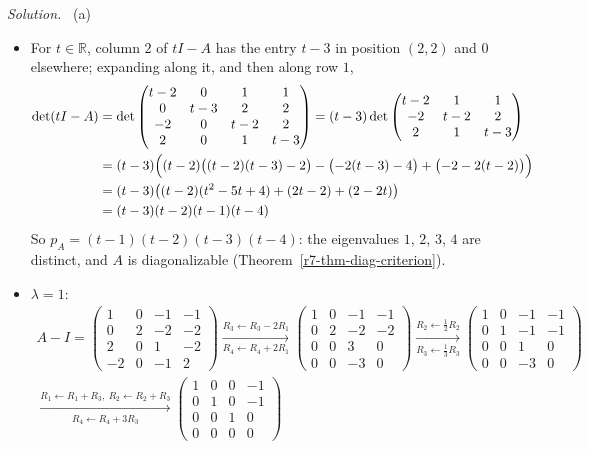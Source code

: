 \documentclass[12pt]{article}
\newcommand{\R}{\mathbb R}
\theoremstyle{definition}
\newenvironment{solution}{\par\noindent\textit{Solution.}\ }{\par\smallskip}
\begin{document}
\begin{solution}
(a)
\begin{itemize}
\item For \(t\in\R\), column \(2\) of \(tI-A\) has the entry \(t-3\) in position \((2,2)\) and \(0\) elsewhere; expanding
along it, and then along row \(1\),
\[
\begin{aligned}
\det(tI-A)&=\det\begin{pmatrix}t-2&0&1&1\\0&t-3&2&2\\-2&0&t-2&2\\2&0&1&t-3\end{pmatrix}
=(t-3)\det\begin{pmatrix}t-2&1&1\\-2&t-2&2\\2&1&t-3\end{pmatrix}\\
&=(t-3)\Bigl((t-2)\bigl((t-2)(t-3)-2\bigr)-\bigl(-2(t-3)-4\bigr)+\bigl(-2-2(t-2)\bigr)\Bigr)\\
&=(t-3)\bigl((t-2)(t^2-5t+4)+(2t-2)+(2-2t)\bigr)\\
&=(t-3)(t-2)(t-1)(t-4)
\end{aligned}
\]
So \(p_A=(t-1)(t-2)(t-3)(t-4)\): the eigenvalues \(1\), \(2\), \(3\), \(4\) are distinct, and \(A\) is diagonalizable
(Theorem~\ref{r7-thm-diag-criterion}).
\item \(\lambda=1\):
\[
\begin{gathered}
A-I=\begin{pmatrix}1&0&-1&-1\\0&2&-2&-2\\2&0&1&-2\\-2&0&-1&2\end{pmatrix}
\xrightarrow[R_4\leftarrow R_4+2R_1]{R_3\leftarrow R_3-2R_1}
\begin{pmatrix}1&0&-1&-1\\0&2&-2&-2\\0&0&3&0\\0&0&-3&0\end{pmatrix}
\xrightarrow[R_3\leftarrow\frac13R_3]{R_2\leftarrow\frac12R_2}
\begin{pmatrix}1&0&-1&-1\\0&1&-1&-1\\0&0&1&0\\0&0&-3&0\end{pmatrix}
\\
\xrightarrow[R_4\leftarrow R_4+3R_3]{R_1\leftarrow R_1+R_3,\ R_2\leftarrow R_2+R_3}
\begin{pmatrix}1&0&0&-1\\0&1&0&-1\\0&0&1&0\\0&0&0&0\end{pmatrix}

\end{gathered}\]
\end{itemize}
\end{solution}
\end{document}

